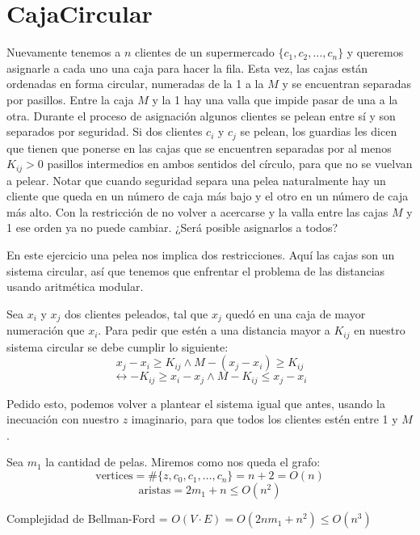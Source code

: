 \documentclass{article}
\begin{document}
\section*{CajaCircular}

Nuevamente tenemos a $n$ clientes de un supermercado $\{c_1, c_2, \ldots, c_n\}$ y queremos asignarle a cada uno una caja para hacer la fila. Esta vez, las cajas están ordenadas en forma circular, numeradas de la 1 a la $M$ y se encuentran separadas por pasillos. Entre la caja $M$ y la 1 hay una valla que impide pasar de una a la otra. Durante el proceso de asignación algunos clientes se pelean entre sí y son separados por seguridad. Si dos clientes $c_i$ y $c_j$ se pelean, los guardias les dicen que tienen que ponerse en las cajas que se encuentren separadas por al menos $K_{ij} > 0$ pasillos intermedios en ambos sentidos del círculo, para que no se vuelvan a pelear. Notar que cuando seguridad separa una pelea naturalmente hay un cliente que queda en un número de caja más bajo y el otro en un número de caja más alto. Con la restricción de no volver a acercarse y la valla entre las cajas $M$ y 1 ese orden ya no puede cambiar. ¿Será posible asignarlos a todos?

En este ejercicio una pelea nos implica dos restricciones. Aquí las cajas son un sistema circular, así que tenemos que enfrentar el problema de las distancias usando aritmética modular.

Sea $x_i$ y $x_j$ dos clientes peleados, tal que $x_j$ quedó en una caja de mayor numeración que $x_i$. Para pedir que estén a una distancia mayor a $K_{ij}$ en nuestro sistema circular se debe cumplir lo siguiente:
\[
x_j - x_i \geq K_{ij} \land M - (x_j - x_i) \geq K_{ij} 
\]
\[
\leftrightarrow  -K_{ij} \geq x_i - x_j \land   M - K_{ij} \leq x_j - x_i
\]

Pedido esto, podemos volver a plantear el sistema igual que antes, usando la inecuación con nuestro $z$ imaginario, para que todos los clientes estén entre 1 y $M$.

Sea $m_1$ la cantidad de pelas. Miremos como nos queda el grafo:
\[
\text{vertices} = \# \{z,c_0,c_1,\ldots,c_n\} = n + 2 = O(n)
\]
\[
\text{aristas} = 2m_1 + n \leq O(n^2)
\]

Complejidad de Bellman-Ford = $O(V \cdot E) = O(2nm_1 + n^{2}) \leq O(n^3)$
\end{document}
